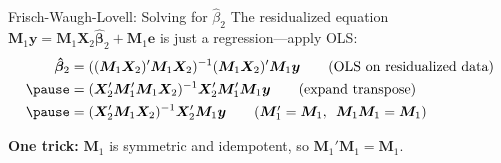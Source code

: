 \documentclass[aspectratio=169, handout, t]{beamer}
\numberwithin{equation}{section}
\begin{document}
\begin{frame}{Frisch-Waugh-Lovell: Solving for $\hat{\beta}_2$}
The residualized equation $\bm{M}_1\bm{y}=\bm{M}_1 \bm{X}_2 \bm{\hat{\beta}}_2+\bm{M}_1\bm{e}$ is just a regression---apply OLS:
\begin{align*}
\bm{\hat{\beta}}_2&=((\bm{M}_1\bm{X}_2)'\bm{M}_1\bm{X}_2)^{-1}(\bm{M}_1\bm{X}_2)'\bm{M}_1\bm{y} \tag{OLS on residualized data}\\\pause
&=(\bm{X}_2'\bm{M}_1'\bm{M}_1\bm{X}_2)^{-1}\bm{X}'_2\bm{M}_1'\bm{M}_1\bm{y} \tag{expand transpose}\\\pause
&=(\bm{X}_2'\bm{M}_1\bm{X}_2)^{-1}\bm{X}'_2\bm{M}_1\bm{y} \tag{$\bm{M}_1'=\bm{M}_1$, \ $\bm{M}_1\bm{M}_1=\bm{M}_1$}
\end{align*}\pause
\begin{tcolorbox}[colback=blue!5, colframe=blue!50, boxsep=2pt, top=2pt, bottom=2pt]
\textbf{One trick:} $\bm{M}_1$ is symmetric and idempotent, so $\bm{M}_1'\bm{M}_1 = \bm{M}_1$.
\end{tcolorbox}
\end{frame}
\end{document}

